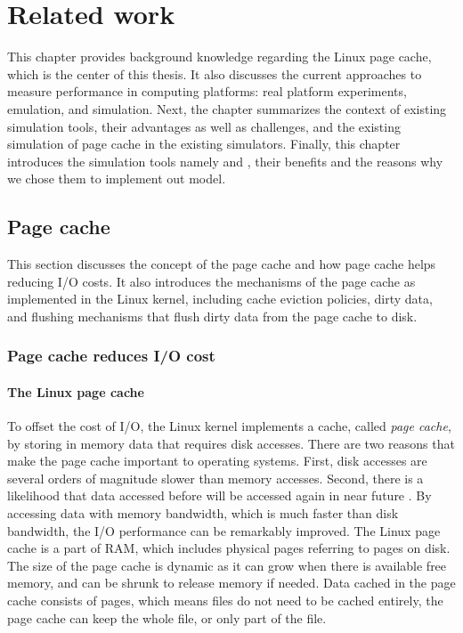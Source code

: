 \chapter{Related work}
\label{relatedwork}

This chapter provides background knowledge regarding the Linux page cache, 
which is the center of this thesis. 
It also discusses the current approaches to measure performance in computing platforms: real platform experiments, 
emulation, and simulation.
Next, the chapter summarizes the context of existing simulation tools, their 
advantages as well as challenges, and the existing simulation of page cache in the 
existing simulators. 
Finally, this chapter introduces the simulation tools namely \simgrid and \wrench, 
their benefits and the reasons why we chose them to implement out model. 

\section{Page cache}

This section discusses the concept of the page cache and how page cache 
helps reducing I/O costs.
It also introduces the mechanisms of the page cache as implemented 
in the Linux kernel, including cache eviction policies, dirty data, and flushing 
mechanisms that flush dirty data from the page cache to disk. 

\subsection{Page cache reduces I/O cost}

\subsubsection{The Linux page cache}

To offset the cost of I/O, the Linux kernel implements a cache, 
called \textit{page cache}, by storing in memory data that requires 
disk accesses. 
There are two reasons that make the page cache important to 
operating systems. 
First, disk accesses are several orders of magnitude slower than 
memory accesses. 
Second, there is a likelihood that data accessed before will be accessed 
again in near future \cite{linuxdev3rd2010}. 
By accessing data with memory bandwidth, which is much faster than disk 
bandwidth, the I/O performance can be remarkably improved. 
The Linux page cache is a part of RAM, which includes physical pages 
referring to pages on disk. 
The size of the page cache is dynamic as it can grow when there is 
available free memory, and can be shrunk to release memory if needed. 
Data cached in the page cache consists of pages, which means files 
do not need to be cached entirely, the page cache can keep the whole file, 
or only part of the file. 

